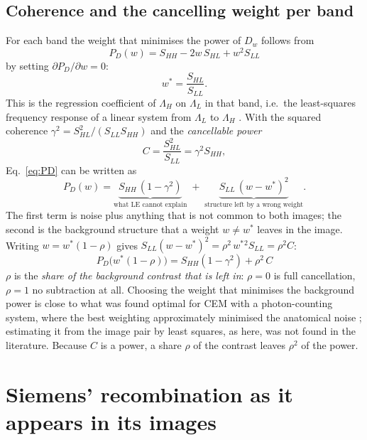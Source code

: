 \documentclass[11pt,a4paper]{article}
\newcommand{\LL}{\Lambda_L}
\newcommand{\LH}{\Lambda_H}
\newcommand{\ws}{w^{*}}
\begin{document}
\subsection{Coherence and the cancelling weight per band}
For each band the weight that minimises the power of $D_w$ follows from
\begin{equation}
P_D(w) = S_{HH} - 2w\,S_{HL} + w^2 S_{LL}
\label{eq:PD}
\end{equation}
by setting $\partial P_D/\partial w=0$:
\begin{equation}
\ws = \frac{S_{HL}}{S_{LL}} .
\label{eq:wstar}
\end{equation}
This is the regression coefficient of $\LH$ on $\LL$ in that band, i.e.\ the least-squares frequency response of
a linear system from $\LL$ to $\LH$ \cite[ch.~6]{bendat2010}. With the squared coherence \cite{bendat2010,carter1973}
$\gamma^2 = S_{HL}^2/(S_{LL}S_{HH})$ and the \emph{cancellable power}
\begin{equation}
C = \frac{S_{HL}^2}{S_{LL}} = \gamma^2 S_{HH},
\label{eq:C}
\end{equation}
Eq.~\eqref{eq:PD} can be written as
\begin{equation}
P_D(w) = \underbrace{S_{HH}\,(1-\gamma^2)}_{\text{what LE cannot explain}} \;+\; \underbrace{S_{LL}\,(w-\ws)^2}_{\text{structure left by a wrong weight}} .
\label{eq:PDsplit}
\end{equation}
The first term is noise plus anything that is not common to both images; the second is the background structure
that a weight $w\neq\ws$ leaves in the image. Writing $w=\ws(1-\rho)$ gives $S_{LL}(w-\ws)^2=\rho^2\,\ws{}^2S_{LL}=\rho^2 C$:
\begin{equation}
\boxed{\;P_D\big(\ws(1-\rho)\big) = S_{HH}(1-\gamma^2) + \rho^2\,C\;}
\label{eq:rho}
\end{equation}
$\rho$ is the \emph{share of the background contrast that is left in}: $\rho=0$ is full cancellation, $\rho=1$ no
subtraction at all. Choosing the weight that minimises the background power is close to what was found optimal for
CEM with a photon-counting system, where the best weighting approximately minimised the anatomical noise
\cite{fredenberg2010}; estimating it from the image pair by least squares, as here, was not found in the
literature. Because $C$ is a power, a share $\rho$ of the contrast leaves $\rho^2$ of the power.

\section{Siemens' recombination as it appears in its images}
\end{document}
